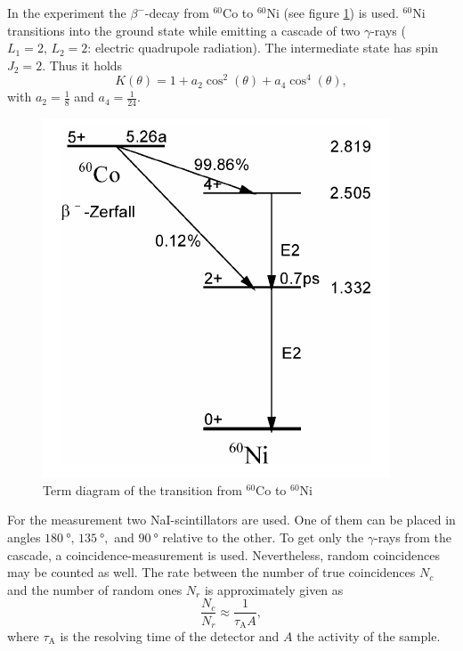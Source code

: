 In the experiment the $\beta^{-}$-decay from $^{60}$Co to $^{60}$Ni (see figure \ref{fig:term}) is used. $^{60}$Ni transitions into the ground state while emitting a cascade of two $\gamma$-rays ($L_{1}=2,\,L_{2}=2$: electric quadrupole radiation). The intermediate state has spin $J_{2}=2$. Thus it holds
\begin{equation}
 K(\theta) = 1 + a_{2}\cos^{2}(\theta) + a_{4}\cos^{4}(\theta),
\end{equation}
with $a_{2}=\frac{1}{8}$ and $a_{4}=\frac{1}{24}$. \cite{BB}

\begin{figure}[tb]
 \centering
 \includegraphics[scale=0.8]{./fig/termschema.png}
 \caption{Term diagram of the transition from $^{60}$Co to $^{60}$Ni \cite{BB}}
 \label{fig:term}
\end{figure}

For the measurement two NaI-scintillators are used. One of them can be placed in angles $\SI{180}{\degree},\,\SI{135}{\degree},$ and $\SI{90}{\degree}$ relative to the other. To get only the $\gamma$-rays from the cascade, a coincidence-measurement is used. Nevertheless, random coincidences may be counted as well. The rate between the number of true coincidences $N_{c}$ and the number of random ones $N_{r}$ is approximately given as
\begin{equation}
 \frac{N_{c}}{N_{r}} \approx \frac{1}{\tau_{\textrm{A}}A},
\end{equation}
where $\tau_{\textrm{A}}$ is the resolving time of the detector and $A$ the activity of the sample.



